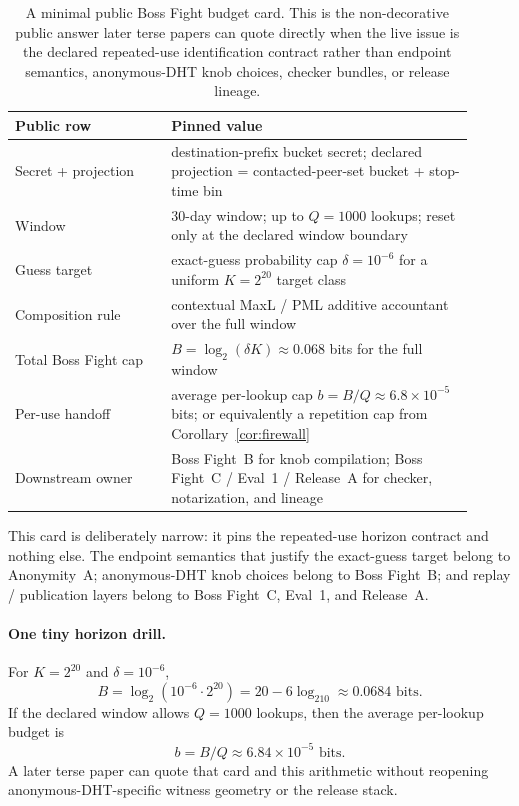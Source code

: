 \documentclass[11pt]{article}
\newcommand{\logtwo}{\log_2}
\begin{document}
\begin{table}[t]
\centering
\small
\begin{tabular}{@{}p{0.31\linewidth}p{0.60\linewidth}@{}}
\toprule
\textbf{Public row} & \textbf{Pinned value}\\
\midrule
Secret + projection & destination-prefix bucket secret; declared projection = contacted-peer-set bucket + stop-time bin \\
Window & 30-day window; up to $Q=1000$ lookups; reset only at the declared window boundary \\
Guess target & exact-guess probability cap $\delta=10^{-6}$ for a uniform $K=2^{20}$ target class \\
Composition rule & contextual MaxL / PML additive accountant over the full window \\
Total Boss Fight cap & $B=\logtwo(\delta K) \approx 0.068$ bits for the full window \\
Per-use handoff & average per-lookup cap $b=B/Q \approx 6.8\times 10^{-5}$ bits; or equivalently a repetition cap from Corollary~\ref{cor:firewall} \\
Downstream owner & Boss Fight~B for knob compilation; Boss Fight~C / Eval~1 / Release~A for checker, notarization, and lineage \\
\bottomrule
\end{tabular}
\caption{A minimal public Boss Fight budget card. This is the non-decorative public answer later terse papers can quote directly when the live issue is the declared repeated-use identification contract rather than endpoint semantics, anonymous-DHT knob choices, checker bundles, or release lineage.}
\label{tab:minimal-bossfight-card}
\end{table}

This card is deliberately narrow: it pins the repeated-use horizon contract and nothing else. The endpoint semantics that justify the exact-guess target belong to Anonymity~A; anonymous-DHT knob choices belong to Boss Fight~B; and replay / publication layers belong to Boss Fight~C, Eval~1, and Release~A.\cite{series:oddsinflation,series:bossfightB,series:bossfightC,series:evalnotary,series:releaseproperty}

\paragraph{One tiny horizon drill.} For $K=2^{20}$ and $\delta=10^{-6}$,
\[
B=\logtwo(10^{-6}\cdot 2^{20}) = 20 - 6\logtwo 10 \approx 0.0684 \text{ bits}.
\]
If the declared window allows $Q=1000$ lookups, then the average per-lookup budget is
\[
b = B/Q \approx 6.84\times 10^{-5} \text{ bits}.
\]
A later terse paper can quote that card and this arithmetic without reopening anonymous-DHT-specific witness geometry or the release stack.
\end{document}
